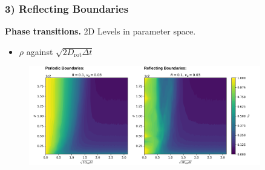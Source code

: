 \begin{frame}
	\frametitle{3) Reflecting Boundaries}
	\textbf{Phase transitions.} 2D Levels in parameter space.
	\begin{itemize}
	    \item $\rho$ against $\sqrt{2D_{\text{rot}}\Delta t}$
	\end{itemize}
	\begin{figure}[H]
  		\includegraphics[width=0.9\textwidth]{images/chapter3/rho_eta_transition_2D_comparison_pbc_rbc.png} 
	\end{figure}
\end{frame}